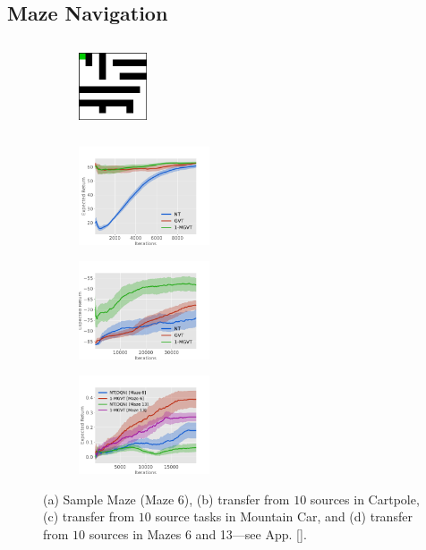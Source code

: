 \documentclass{article}
\begin{document}
\subsection{Maze Navigation} \label{sec:mn}

\begin{figure}[t]
  \begin{subfigure}[b]{0.15\textwidth}
    \includegraphics[trim=0.0cm 0.0cm 0.0cm 0.0cm,clip=true,height=2.6cm, width=2.0cm]{images/maze/maze6.png}
    \caption{}
  \end{subfigure}
  \begin{subfigure}[b]{0.27\textwidth}
    \includegraphics[trim=0.5cm 0cm 1.8cm 1.3cm,clip=true,height=2.9cm]{images/cartpole/lrev.pdf}
    \caption{}
  \end{subfigure}
    \begin{subfigure}[b]{0.27\textwidth}
    \includegraphics[trim=0.5cm 0cm 1.6cm 1.3cm,clip=true,height=2.9cm]{images/mountaincar/lrev.pdf}
    \caption{}
  \end{subfigure}
    \begin{subfigure}[b]{0.27\textwidth}
    \includegraphics[trim=0.5cm 0cm 1.6cm 1.3cm,clip=true,height=2.9cm]{images/maze/lrev.pdf}
    \caption{}
  \end{subfigure}
  \caption{(a) Sample Maze (Maze 6), (b) transfer from $10$ sources in Cartpole, (c) transfer from $10$ source tasks in Mountain Car, and (d) transfer from $10$ sources in Mazes 6 and 13---see App. \ref{}.}
  \label{fig:ccmazeplots}
\end{figure}
\end{document}
